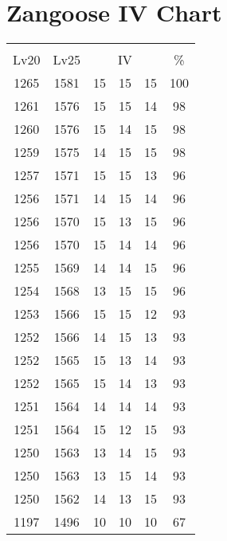 \documentclass{article}%
\begin{document}
%
\normalsize%
\section{Zangoose IV Chart}%
\label{sec:Zangoose IV Chart}%
\renewcommand{\arraystretch}{1.5}%
\begin{tabular}{|c|c|c|c|c|c|}%
\hline%
\multicolumn{6}{|c|}{\textcolor{white}{ 
\linebreak{Zangoose}
}%
\cellcolor{black}}\\%
\multicolumn{1}{|c}{Lv20}&\multicolumn{1}{c|}{Lv25}&\multicolumn{3}{c|}{IV}&\multicolumn{1}{|c|}{\%}\\%
\hline%
\rowcolor{color100}%
1265&1581&15&15&15&100\\%
\hline%
\rowcolor{color98}%
1261&1576&15&15&14&98\\%
\hline%
\rowcolor{color98}%
1260&1576&15&14&15&98\\%
\hline%
\rowcolor{color98}%
1259&1575&14&15&15&98\\%
\hline%
\rowcolor{color96}%
1257&1571&15&15&13&96\\%
\hline%
\rowcolor{color96}%
1256&1571&14&15&14&96\\%
\hline%
\rowcolor{color96}%
1256&1570&15&13&15&96\\%
\hline%
\rowcolor{color96}%
1256&1570&15&14&14&96\\%
\hline%
\rowcolor{color96}%
1255&1569&14&14&15&96\\%
\hline%
\rowcolor{color96}%
1254&1568&13&15&15&96\\%
\hline%
\rowcolor{color93}%
1253&1566&15&15&12&93\\%
\hline%
\rowcolor{color93}%
1252&1566&14&15&13&93\\%
\hline%
\rowcolor{color93}%
1252&1565&15&13&14&93\\%
\hline%
\rowcolor{color93}%
1252&1565&15&14&13&93\\%
\hline%
\rowcolor{color93}%
1251&1564&14&14&14&93\\%
\hline%
\rowcolor{color93}%
1251&1564&15&12&15&93\\%
\hline%
\rowcolor{color93}%
1250&1563&13&14&15&93\\%
\hline%
\rowcolor{color93}%
1250&1563&13&15&14&93\\%
\hline%
\rowcolor{color93}%
1250&1562&14&13&15&93\\%
\hline%
\rowcolor{color91}%
1197&1496&10&10&10&67\\%
\end{tabular}

%
\end{document}
